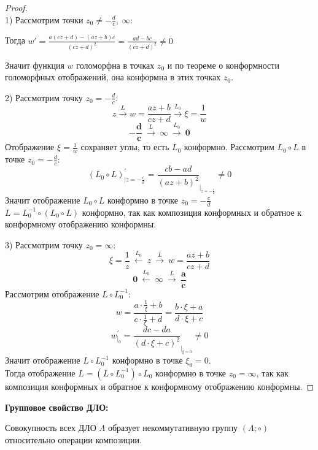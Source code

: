 \begin{proof}
    \ \\
    1) Рассмотрим точки $z_0 \neq -\frac{d}{c}, \ \infty:$
    
    Тогда $w'=\frac{a(cz+d)-(az+b)c}{(cz+d)^2} = \frac{ad-bc}{(cz+d)^2} \neq 0$

    Значит функция $w$ голоморфна в точках $z_0$ и по теореме о конформности голоморфных отображений, она конформна в этих точках $z_0$.

    2) Рассмотрим точку $z_0=-\frac{d}{c}:$ $$z\overset{L}{\longrightarrow}w=\frac{az+b}{cz+d}\overset{L_0}{\longrightarrow} \xi=\frac{1}{w}$$ $$\mathbf{-\frac{d}{c}} \ \overset{L}{\longrightarrow} \ \mathbf{\infty} \ \overset{L_0}{\longrightarrow} \ \mathbf{0}$$
    Отображение $\xi=\frac{1}{w}$ сохраняет углы, то есть $L_0$ конформно.
    Рассмотрим $L_0\circ L$ в точке $z_0=-\frac{d}{c}:$
    $$(L_0\circ L)^{'}_{|z=-\frac{c}{d}} = \frac{cb-ad}{(az+b)^2}_{|_{z=-\frac{c}{d}}} \neq 0$$
    Значит отображение $L_0\circ L$ конформно в точке $z_0=-\frac{c}{d}$\\
    $L=L_0^{-1}\circ (L_0\circ L)$ конформно, так как композиция конформных и обратное к конформному отображению конформны.

    3) Рассмотрим точку $z_0=\infty$:
    $$\xi=\frac{1}{z} \ \overset{L_0}{\longleftarrow} \ z \ \overset{L}{\longrightarrow} \ w=\frac{az+b}{cz+d}$$
    $$\mathbf{0} \ \overset{L_0}{\longleftarrow} \ \mathbf{\infty} \ \overset{L}{\longrightarrow} \ \mathbf{\frac{a}{c}}$$
    Рассмотрим отображение $L\circ L_0^{-1}$:
    $$w=\frac{a\cdot \frac{1}{\xi}+b}{c\cdot \frac{1}{\xi}+d} = \frac{b\cdot \xi+a}{d\cdot \xi +c}$$
    $$w^{'}_{|_{0}} = \frac{dc-da}{(d\cdot\xi+c)^2}_{|_{\xi=0}}\neq 0$$
    Значит отображение $L\circ L_{0}^{-1}$ конформно в точке $\xi_0 = 0$.\\
    Тогда отображение $L=(L\circ L_{0}^{-1})\circ L_0$ конформно в точке $z_0=\infty$, так как композиция конформных и обратное к конформному отображению конформны. 
\end{proof}

\textbf{Групповое свойство ДЛО:}

Совокупность всех ДЛО $\Lambda$ образует некоммутативную группу $(\Lambda; \circ)$ относительно операции композиции.

